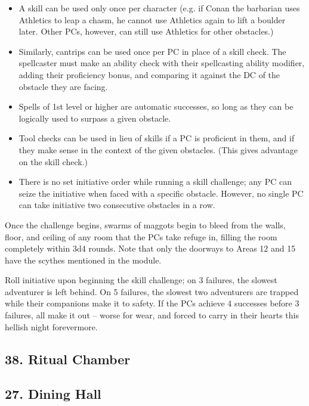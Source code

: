 \begin{itemize}
  \item A skill can be used only once per character (e.g. if Conan the barbarian uses Athletics to leap a chasm,
  he cannot use Athletics again to lift a boulder later. Other PCs, however, can still use Athletics for other
  obstacles.)
  \item Similarly, cantrips can be used once per PC in place of a skill check. The spellcaster must make an
  ability check with their spellcasting ability modifier, adding their proficiency bonus, and comparing it
  against the DC of the obstacle they are facing.
  \item Spells of 1st level or higher are automatic successes, so long as they can be logically used to surpass
  a given obstacle.
  \item Tool checks can be used in lieu of skills if a PC is proficient in them, and if they make sense in the
  context of the given obstacles. (This gives advantage on the skill check.)
  \item There is no set initiative order while running a skill challenge; any PC can seize the initiative when
  faced with a specific obstacle. However, no single PC can take initiative two consecutive obstacles in a row.
\end{itemize}
Once the challenge begins, swarms of maggots begin to bleed from the walls, floor, and ceiling of any room that
the PCs take refuge in, filling the room completely within 3d4 rounds. Note that only the doorways to Areas 12
and 15 have the scythes mentioned in the module.

Roll initiative upon beginning the skill challenge; on 3 failures, the slowest adventurer is left behind. On
5 failures, the slowest two adventurers are trapped while their companions make it to safety. If the PCs achieve
4 successes before 3 failures, all make it out -- worse for wear, and forced to carry in their hearts this hellish
night forevermore.

\begin{arealinks}
\end{arealinks}


\pagebreak
\subsection*{38. Ritual Chamber}
\label{sec:SC38}

\begin{arealinks}
\end{arealinks}


\pagebreak
\subsection*{27. Dining Hall}
\label{sec:SC27}
